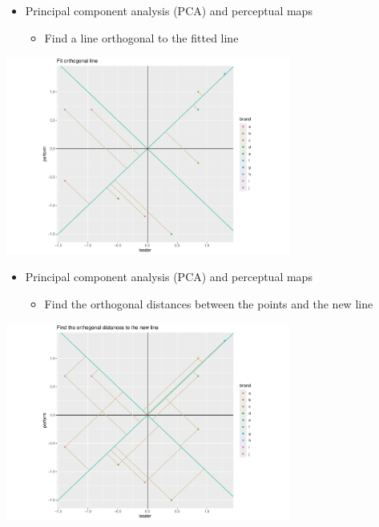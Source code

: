 \documentclass[
  ignorenonframetext,
]{beamer}
\providecommand{\tightlist}{%
  \setlength{\itemsep}{0pt}\setlength{\parskip}{0pt}}\usepackage{longtable,booktabs,array}
\begin{document}
\begin{frame}{}
\label{section-16}
\begin{itemize}
\item
  Principal component analysis (PCA) and perceptual maps

  \begin{itemize}
  \tightlist
  \item
    Find a line orthogonal to the fitted line
  \end{itemize}
\end{itemize}

\begin{center}
\includegraphics[width=0.7\textwidth,height=\textheight]{008_reducing_data_complexity_files/figure-beamer/unnamed-chunk-15-1.pdf}
\end{center}
\end{frame}

\begin{frame}{}
\label{section-17}
\begin{itemize}
\item
  Principal component analysis (PCA) and perceptual maps

  \begin{itemize}
  \tightlist
  \item
    Find the orthogonal distances between the points and the new line
  \end{itemize}
\end{itemize}

\begin{center}
\includegraphics[width=0.7\textwidth,height=\textheight]{008_reducing_data_complexity_files/figure-beamer/unnamed-chunk-16-1.pdf}
\end{center}
\end{frame}
\end{document}
